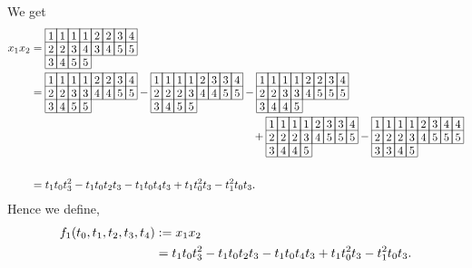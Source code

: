 We get
\begin{align*}
x_1x_2 
& = 
\begin{array}[c]{*{8}c}\cline{1-8}
\lr{1}&\lr{1}&\lr{1}&\lr{1}&\lr{2}&\lr{2}&\lr{3}&\lr{4}\\\cline{1-8}
\lr{2}&\lr{2}&\lr{3}&\lr{4}&\lr{3}&\lr{4}&\lr{5}&\lr{5}\\\cline{1-8}
\lr{3}&\lr{4}&\lr{5}&\lr{5}\\\cline{1-4}
\end{array}\\
&=\begin{array}[c]{*{8}c}\cline{1-8}
\lr{1}&\lr{1}&\lr{1}&\lr{1}&\lr{2}&\lr{2}&\lr{3}&\lr{4}\\\cline{1-8}
\lr{2}&\lr{2}&\lr{3}&\lr{3}&\lr{4}&\lr{4}&\lr{5}&\lr{5}\\\cline{1-8}
\lr{3}&\lr{4}&\lr{5}&\lr{5}\\\cline{1-4}
\end{array}
-\begin{array}[c]{*{8}c}\cline{1-8}
\lr{1}&\lr{1}&\lr{1}&\lr{1}&\lr{2}&\lr{3}&\lr{3}&\lr{4}\\\cline{1-8}
\lr{2}&\lr{2}&\lr{2}&\lr{3}&\lr{4}&\lr{4}&\lr{5}&\lr{5}\\\cline{1-8}
\lr{3}&\lr{4}&\lr{5}&\lr{5}\\\cline{1-4}
\end{array}
-\begin{array}[c]{*{8}c}\cline{1-8}
\lr{1}&\lr{1}&\lr{1}&\lr{1}&\lr{2}&\lr{2}&\lr{3}&\lr{4}\\\cline{1-8}
\lr{2}&\lr{2}&\lr{3}&\lr{3}&\lr{4}&\lr{5}&\lr{5}&\lr{5}\\\cline{1-8}
\lr{3}&\lr{4}&\lr{4}&\lr{5}\\\cline{1-4}
\end{array}\\
&\hspace{200pt}
+\begin{array}[c]{*{8}c}\cline{1-8}
\lr{1}&\lr{1}&\lr{1}&\lr{1}&\lr{2}&\lr{3}&\lr{3}&\lr{4}\\\cline{1-8}
\lr{2}&\lr{2}&\lr{2}&\lr{3}&\lr{4}&\lr{5}&\lr{5}&\lr{5}\\\cline{1-8}
\lr{3}&\lr{4}&\lr{4}&\lr{5}\\\cline{1-4}
\end{array}
-\begin{array}[c]{*{8}c}\cline{1-8}
\lr{1}&\lr{1}&\lr{1}&\lr{1}&\lr{2}&\lr{3}&\lr{4}&\lr{4}\\\cline{1-8}
\lr{2}&\lr{2}&\lr{2}&\lr{3}&\lr{4}&\lr{5}&\lr{5}&\lr{5}\\\cline{1-8}
\lr{3}&\lr{3}&\lr{4}&\lr{5}\\\cline{1-4}
\end{array}\\
& \\
&=
t_1t_0t_3^2 - t_1t_0t_2t_3 - t_1t_0t_4t_3 + t_1t_0^2t_3 - t_1^2t_0t_3.
\end{align*}
Hence we define,
\begin{align*}
f_1(t_0,t_1,t_2,t_3,t_4) &:= x_1x_2\\
& = t_1t_0t_3^2 - t_1t_0t_2t_3 - t_1t_0t_4t_3 + t_1t_0^2t_3 - t_1^2t_0t_3.
\end{align*}

